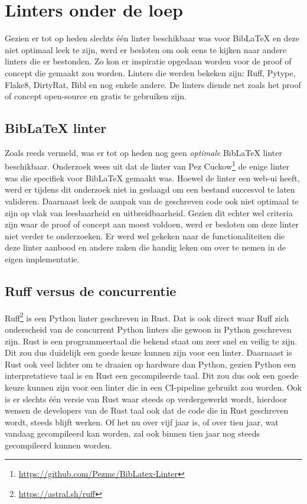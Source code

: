 \section{Linters onder de loep}
\label{sec:linters-onder-de-loep}

Gezien er tot op heden slechts één linter beschikbaar was voor BibLaTeX en deze niet optimaal leek te zijn, werd er besloten om ook eens te kijken naar andere linters die er bestonden. Zo kon er inspiratie opgedaan worden voor de proof of concept die gemaakt zou worden. Linters die werden bekeken zijn: Ruff, Pytype, Flake8, DirtyRat, Bibl en nog enkele andere. De linters diende net zoals het proof of concept open-source en gratis te gebruiken zijn.

\subsection{BibLaTeX linter}
\label{sec:biblatex-linter}
Zoals reeds vermeld, was er tot op heden nog geen \emph{optimale} BibLaTeX linter beschikbaar. Onderzoek wees uit dat de linter van Pez Cuckow\footnote{\url{https://github.com/Pezmc/BibLatex-Linter}} de enige linter was die specifiek voor BibLaTeX gemaakt was. Hoewel de linter een web-ui heeft, werd er tijdens dit onderzoek niet in geslaagd om een bestand succesvol te laten valideren. Daarnaast leek de aanpak van de geschreven code ook niet optimaal te zijn op vlak van leesbaarheid en uitbreidbaarheid. Gezien dit echter wel criteria zijn waar de proof of concept aan moest voldoen, werd er besloten om deze linter niet verder te onderzoeken. Er werd wel gekeken naar de functionaliteiten die deze linter aanbood en andere zaken die handig leken om over te nemen in de eigen implementatie.


\subsection{Ruff versus de concurrentie}
\label{subsec:ruff}
Ruff\footnote{\url{https://astral.sh/ruff}} is een Python linter geschreven in Rust. Dat is ook direct waar Ruff zich onderscheid van de concurrent Python linters die gewoon in Python geschreven zijn. Rust is een programmeertaal die bekend staat om zeer snel en veilig te zijn. Dit zou dus duidelijk een goede keuze kunnen zijn voor een linter. Daarnaast is Rust ook veel lichter om te draaien op hardware dan Python, gezien Python een interpretatieve taal is en Rust een gecompileerde taal. 
Dit zou dus ook een goede keuze kunnen zijn voor een linter die in een CI-pipeline gebruikt zou worden. Ook is er slechts één versie van Rust waar steeds op verdergewerkt wordt, hierdoor wensen de developers van de Rust taal ook dat de code die in Rust geschreven wordt, steeds blijft werken. Of het nu over vijf jaar is, of over tien jaar, wat vandaag gecompileerd kan worden, zal ook binnen tien jaar nog steeds gecompileerd kunnen worden. 

